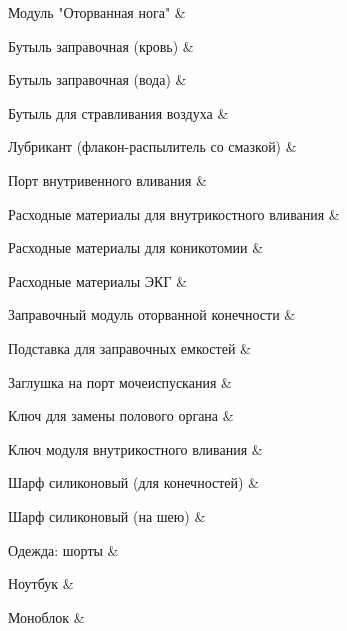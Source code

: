 {        Модуль "Оторванная нога" & \\ \hline
        
        Бутыль заправочная (кровь) & \\ \hline
        
        Бутыль заправочная (вода) & \\ \hline
        
        Бутыль для стравливания воздуха & \\ \hline
        
        Лубрикант (флакон-распылитель со смазкой) & \\ \hline
        
        Порт внутривенного вливания & \\ \hline
        
        Расходные материалы для внутрикостного вливания & \\ \hline
        
        Расходные материалы для коникотомии & \\ \hline
        
        Расходные материалы ЭКГ & \\ \hline
        
        Заправочный модуль оторванной конечности & \\ \hline
        
        Подставка для заправочных емкостей & \\ \hline
        
        Заглушка на порт мочеиспускания & \\ \hline
        
        Ключ для замены полового органа & \\ \hline
        
        Ключ модуля внутрикостного вливания & \\ \hline
        
        Шарф силиконовый (для конечностей) & \\ \hline
        
        Шарф силиконовый (на шею) & \\ \hline
        
        Одежда: шорты & \\ \hline
        
        Ноутбук & \\ \hline
        
        Моноблок & \\ \hline
        
}
